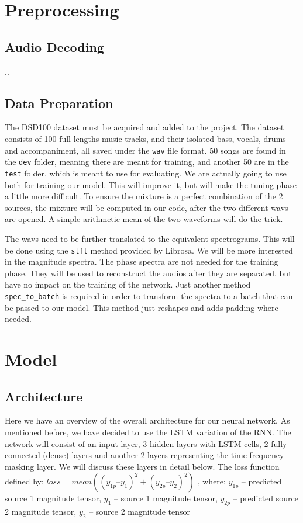 \documentclass[../Thesis.tex]{subfiles}
\begin{document}
 
\section  {Preprocessing}
\subsection {Audio Decoding}
..

\subsection {Data Preparation}

The DSD100 dataset must be acquired and added to the project. The dataset consists of 100 full lengths music tracks, and their isolated bass, vocals, drums and accompaniment, all saved under the \texttt{wav} file format. 50 songs are found in the \texttt{dev} folder, meaning there are meant for training, and another 50 are in the \texttt{test} folder, which is meant to use for evaluating. We are actually going to use both for training our model. This will improve it, but will make the tuning phase a little more difficult. To ensure the mixture is a perfect combination of the 2 sources, the mixture will be computed in our code, after the two different wavs are opened. A simple arithmetic mean of the two waveforms will do the trick.

The wavs need to be further translated to the equivalent spectrograms. This will be done using the \texttt{stft} method provided by Librosa. We will be more interested in the magnitude spectra. The phase spectra are not needed for the training phase. They will be used to reconstruct the audios after they are separated, but have no impact on the training of the network. Just another method \texttt{spec\_to\_batch} is required in order to transform the spectra to a batch that can be passed to our model. This method just reshapes and adds padding where needed.


\section {Model}
\subsection {Architecture}

Here we have an overview of the overall architecture for our neural network. As mentioned before, we have decided to use the LSTM variation of the RNN. The network will consist of an input layer, 3 hidden layers with LSTM cells, 2 fully connected (dense) layers and another 2 layers representing the time-frequency masking layer. We will discuss these layers in detail below.
The loss function defined by:  $\mathit{loss} = \mathit{mean}( {( \mathit{y}_{1\mathit{p}} – \mathit{y}_1 )}_{}^2 + {( \mathit{y}_{2\mathit{p}} – \mathit{y}_2 )}_{}^2)$ , 
where: $ \mathit{y}_{1\mathit{p}} $ – predicted source 1 magnitude tensor, $ \mathit{y}_{1} $ – source 1 magnitude tensor, $ \mathit{y}_{2\mathit{p}} $ – predicted source 2 magnitude tensor, $ \mathit{y}_{2} $ – source 2 magnitude tensor 
\end{document}
